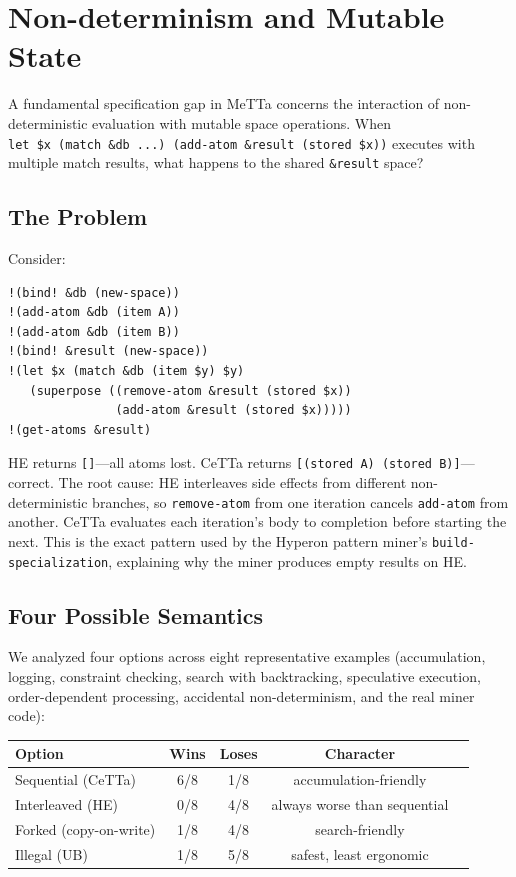 \documentclass[11pt]{article}
\newcommand{\code}[1]{\texttt{#1}}
\newcommand{\HE}{\textup{HE}}
\newcommand{\CeTTa}{\textup{CeTTa}}
\begin{document}
\section{Non-determinism and Mutable State}
\label{sec:nondet-state}

A fundamental specification gap in MeTTa concerns the interaction of
non-deterministic evaluation with mutable space operations.  When
\code{let~\$x~(match~\&db~...)~(add-atom~\&result~(stored~\$x))}
executes with multiple match results, what happens to the shared
\code{\&result} space?

\subsection{The Problem}

Consider:
\begin{lstlisting}[language={},basicstyle=\ttfamily\scriptsize]
!(bind! &db (new-space))
!(add-atom &db (item A))
!(add-atom &db (item B))
!(bind! &result (new-space))
!(let $x (match &db (item $y) $y)
   (superpose ((remove-atom &result (stored $x))
               (add-atom &result (stored $x)))))
!(get-atoms &result)
\end{lstlisting}

\HE{} returns \code{[]}---all atoms lost.  \CeTTa{} returns
\code{[(stored~A)~(stored~B)]}---correct.  The root cause:
\HE{} interleaves side effects from different non-deterministic
branches, so \code{remove-atom} from one iteration cancels
\code{add-atom} from another.  \CeTTa{} evaluates each iteration's
body to completion before starting the next.  This is the exact
pattern used by the Hyperon pattern miner's
\code{build-specialization}, explaining why the miner produces
empty results on \HE{}.

\subsection{Four Possible Semantics}

We analyzed four options across eight representative examples
(accumulation, logging, constraint checking, search with
backtracking, speculative execution, order-dependent processing,
accidental non-determinism, and the real miner code):

\begin{center}
\begin{tabular}{lcccc}
\toprule
Option & Wins & Loses & Character \\
\midrule
Sequential (CeTTa)  & 6/8 & 1/8 & accumulation-friendly \\
Interleaved (HE)    & 0/8 & 4/8 & always worse than sequential \\
Forked (copy-on-write) & 1/8 & 4/8 & search-friendly \\
Illegal (UB)        & 1/8 & 5/8 & safest, least ergonomic \\
\bottomrule
\end{tabular}
\end{center}
\end{document}
